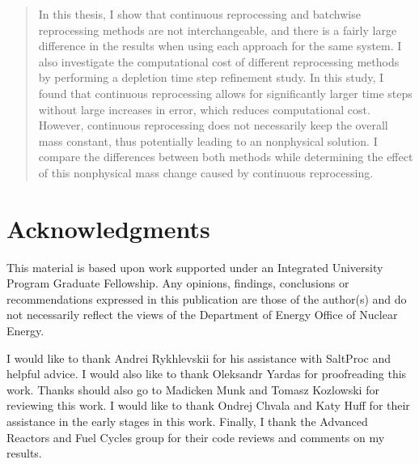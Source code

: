 \documentclass[edeposit,fullpage,hidelinks]{uiucthesis2018}
\begin{document}
\begin{abstract}
In this thesis, I show that continuous reprocessing and batchwise reprocessing methods are not interchangeable, and there is a fairly large difference in the results when using each approach for the same system.
I also investigate the computational cost of different reprocessing methods by performing a depletion time step refinement study.
In this study, I found that continuous reprocessing allows for significantly larger time steps without large increases in error, which reduces computational cost.
However, continuous reprocessing does not necessarily keep the overall mass constant, thus potentially leading to an nonphysical solution.
I compare the differences between both methods while determining the effect of this nonphysical mass change caused by continuous reprocessing.


\end{abstract}

\chapter*{Acknowledgments}

This material is based upon work supported under an Integrated University Program Graduate Fellowship.
Any opinions, findings, conclusions or recommendations expressed in this publication are
those of the author(s) and do not necessarily reflect the views of the Department of Energy
Office of Nuclear Energy.

I would like to thank Andrei Rykhlevskii for his assistance with SaltProc and helpful advice.
I would also like to thank Oleksandr Yardas for proofreading this work.
Thanks should also go to Madicken Munk and Tomasz Kozlowski for reviewing this work.
I would like to thank Ondrej Chvala and Katy Huff for their assistance in the early stages in this work.
Finally, I thank the Advanced Reactors and Fuel Cycles group for their code reviews and comments on my results.


\end{document}
